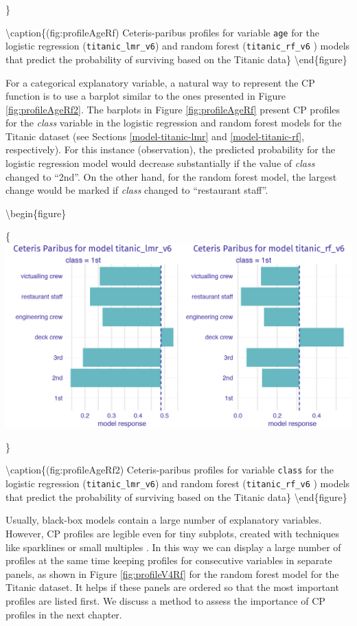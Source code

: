 \documentclass[12pt,]{krantz}
\begin{document}
\}

\textbackslash{}caption\{(fig:profileAgeRf) Ceteris-paribus profiles for variable \texttt{age} for the logistic regression (\texttt{titanic\_lmr\_v6}) and random forest (\texttt{titanic\_rf\_v6} ) models that predict the probability of surviving based on the Titanic data\}\label{fig:profileAgeRf}
\textbackslash{}end\{figure\}

For a categorical explanatory variable, a natural way to represent the CP function is to use a barplot similar to the ones presented in Figure \ref{fig:profileAgeRf2}. The barplots in Figure \ref{fig:profileAgeRf} present CP profiles for the \emph{class} variable in the logistic regression and random forest models for the Titanic dataset (see Sections \ref{model-titanic-lmr} and \ref{model-titanic-rf}, respectively). For this instance (observation), the predicted probability for the logistic regression model would decrease substantially if the value of \emph{class} changed to ``2nd''. On the other hand, for the random forest model, the largest change would be marked if \emph{class} changed to ``restaurant staff''.

\textbackslash{}begin\{figure\}

\{\centering \includegraphics[width=0.7\linewidth]{figure/profile_class_rf}

\}

\textbackslash{}caption\{(fig:profileAgeRf2) Ceteris-paribus profiles for variable \texttt{class} for the logistic regression (\texttt{titanic\_lmr\_v6}) and random forest (\texttt{titanic\_rf\_v6} ) models that predict the probability of surviving based on the Titanic data\}\label{fig:profileAgeRf2}
\textbackslash{}end\{figure\}

Usually, black-box models contain a large number of explanatory variables. However, CP profiles are legible even for tiny subplots, created with techniques like sparklines or small multiples \citep{Tufte1986}. In this way we can display a large number of profiles at the same time keeping profiles for consecutive variables in separate panels, as shown in Figure \ref{fig:profileV4Rf} for the random forest model for the Titanic dataset. It helps if these panels are ordered so that the most important profiles are listed first. We discuss a method to assess the importance of CP profiles in the next chapter.
\end{document}
